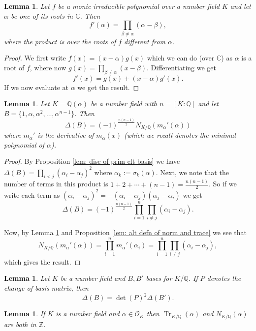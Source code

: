 \documentclass[11pt,a4paper]{amsart}
\theoremstyle{plain}
\newtheorem{lem}[subsection]{Lemma}
\theoremstyle{definition}
\theoremstyle{definition}
\newcommand{\Tr}{\operatorname{Tr}}
\newcommand{\ZZ}{\mathbb{Z}}
\def\CC{\mathbb{C}}
\def\QQ{\mathbb{Q}}
\def \a{\alpha}
\def \OO {\mathcal{O}}
\begin{document}
	\begin{lem}\label{lem: diff of irr pol}
		Let $f$ be a monic irreducible polynomial over a number field $K$ and let $\a$ be one of its roots in $\CC$. Then \[f'(\a)=\prod_{\beta \neq \a} (\a-\beta),  \] where the product is over the roots of $f$ different from $\a$.
	\end{lem}
	
	\begin{proof}
		We first write $f(x)=(x-\a)g(x)$ which we can do (over $\CC$) as $\a$ is a root of $f$, where now $g(x)=\prod_{\beta \neq \a} (x-\beta)$. Differentiating we get \[f'(x)=g(x)+(x-\a)g'(x).\] If we now evaluate at $\a$ we get the result.
	\end{proof}
	
	\begin{lem}\label{lem: num field disc in terms of norm}
		Let $K=\QQ(\a)$ be a number field with $n=[K:\QQ]$ and let $B=\{1,\a,\a^2,\dots,\a^{n-1}\}$. Then \[\Delta(B)=(-1)^{\frac{n(n-1)}{2}}N_{K/\QQ}(m_\a'(\a))\] where $m_\a'$ is the derivative of $m_\a(x)$ (which we recall denotes the minimal polynomial of $\a$).	
	\end{lem}
	\begin{proof}
		By Proposition \ref{lem: disc of prim elt basis} we have $\Delta(B)=\prod_{i < j}(\a_i-\a_j)^2$ where $\a_k:=\sigma_k(\a)$. Next, we note that the number of terms in this product is $1+2+\cdots+(n-1)=\frac{n(n-1)}{2}$. So if we write each term as $(\a_i-\a_j)^2=-(\a_i-\a_j)(\a_j-\a_i)$ we get \[\Delta(B)=(-1)^{\frac{n(n-1)}{2}}\prod_{i=1}^n \prod_{i \neq j} (\a_i-\a_j). \]
		
		Now, by Lemma \ref{lem: diff of irr pol} and Proposition \ref{lem: alt defn of norm and trace} we see that \[N_{K/\QQ}(m_\a'(\a))=\prod_{i=1}^n m_\a'(\a_i)=\prod_{i=1}^n \prod_{i \neq j} (\a_i-\a_j),\] which gives the result.	
	\end{proof}	
	
	\begin{lem}\label{lem: disc change of basis}
		Let $K$ be a number field and $B,B'$ bases for $K/\QQ$. If $P$ denotes the change of basis matrix, then \[\Delta(B)=\det(P)^2 \Delta(B').\]
	\end{lem}
	
	\begin{lem}\label{lem: norm trace of alg int is int}
		If $K$ is a number field and $\a \in \OO_K$ then $\Tr_{K/\QQ}(\a)$ and $N_{K/\QQ}(\a)$ are both in $\ZZ$. 
	\end{lem}	
	
\end{document}
